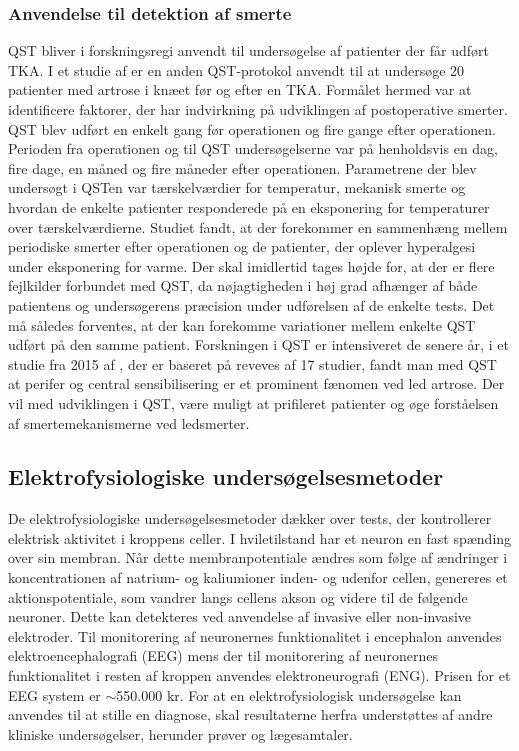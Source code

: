 \subsubsection{Anvendelse til detektion af smerte}
QST bliver i forskningsregi anvendt til undersøgelse af patienter der får udført TKA. I et studie af \citep{Martinez2007} er en anden QST-protokol anvendt til at undersøge 20 patienter med artrose i knæet før og efter en TKA. Formålet hermed var at identificere faktorer, der har indvirkning på udviklingen af postoperative smerter. QST blev udført en enkelt gang før operationen og fire gange efter operationen. Perioden fra operationen og til QST undersøgelserne var på henholdsvis en dag, fire dage, en måned og fire måneder efter operationen. Parametrene der blev undersøgt i QSTen var tærskelværdier for temperatur, mekanisk smerte og hvordan de enkelte patienter responderede på en eksponering for temperaturer over tærskelværdierne. Studiet fandt, at der forekommer en sammenhæng mellem periodiske smerter efter operationen og de patienter, der oplever hyperalgesi under eksponering for varme. \citep{Martinez2007} Der skal imidlertid tages højde for, at der er flere fejlkilder forbundet med QST, da nøjagtigheden i høj grad afhænger af både patientens og undersøgerens præcision under udførelsen af de enkelte tests. Det må således forventes, at der kan forekomme variationer mellem enkelte QST udført på den samme patient. \citep{Yarnitsky2006} Forskningen i QST er intensiveret de senere år, i et studie fra 2015 af , der er baseret på reveves af 17 studier, fandt man med QST at perifer og central sensibilisering er et prominent fænomen ved led artrose. Der vil med udviklingen i QST, være muligt at prifileret patienter og øge forståelsen af smertemekanismerne ved ledsmerter. \citep{Arendt-Nielsen2015}

\subsection{Elektrofysiologiske undersøgelsesmetoder}
De elektrofysiologiske undersøgelsesmetoder dækker over tests, der kontrollerer elektrisk aktivitet i kroppens celler. I hviletilstand har et neuron en fast spænding over sin membran. Når dette membranpotentiale ændres som følge af ændringer i koncentrationen af natrium- og kaliumioner inden- og udenfor cellen, genereres et aktionspotentiale, som vandrer langs cellens akson og videre til de følgende neuroner. Dette kan detekteres ved anvendelse af invasive eller non-invasive elektroder. Til monitorering af neuronernes funktionalitet i encephalon anvendes elektroencephalografi (EEG) mens der til monitorering af neuronernes funktionalitet i resten af kroppen anvendes elektroneurografi (ENG). Prisen for et EEG system er $\sim$550.000 kr. \citep{Biosemi2016} For at en elektrofysiologisk undersøgelse kan anvendes til at stille en diagnose, skal resultaterne herfra understøttes af andre kliniske undersøgelser, herunder prøver og lægesamtaler. \citep{Robinson2008} 

